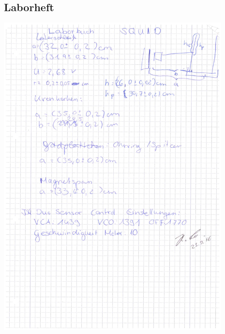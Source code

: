 \documentclass[12pt]{article}
\begin{document}
\subsection{Laborheft}
\begin{minipage}{\textwidth}
\centering
\includegraphics[width=0.89\textwidth]{figures/Laborbuch.pdf}
\end{minipage}
\label{Laborbuch}
\newpage
\listoffigures

\end{document}
